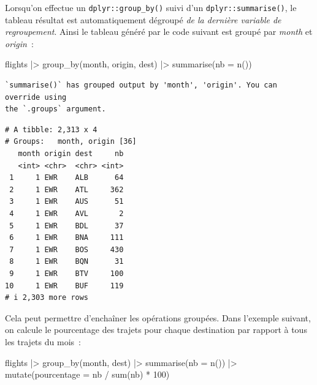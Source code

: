 \documentclass[
  letterpaper,
  DIV=11,
  numbers=noendperiod,
  oneside]{scrreprt}
\newenvironment{Shaded}{\begin{snugshade}}{\end{snugshade}}
\newcommand{\AttributeTok}[1]{\textcolor[rgb]{0.40,0.45,0.13}{#1}}
\newcommand{\DecValTok}[1]{\textcolor[rgb]{0.68,0.00,0.00}{#1}}
\newcommand{\FunctionTok}[1]{\textcolor[rgb]{0.28,0.35,0.67}{#1}}
\newcommand{\NormalTok}[1]{\textcolor[rgb]{0.00,0.23,0.31}{#1}}
\newcommand{\SpecialCharTok}[1]{\textcolor[rgb]{0.37,0.37,0.37}{#1}}
\begin{document}
Lorsqu'on effectue un \texttt{dplyr::group\_by()} suivi d'un
\texttt{dplyr::summarise()}, le tableau résultat est automatiquement
dégroupé \emph{de la dernière variable de regroupement}. Ainsi le
tableau généré par le code suivant est groupé par \emph{month} et
\emph{origin}~:

\begin{Shaded}
\begin{Highlighting}[]
\NormalTok{flights }\SpecialCharTok{|\textgreater{}}
  \FunctionTok{group\_by}\NormalTok{(month, origin, dest) }\SpecialCharTok{|\textgreater{}}
  \FunctionTok{summarise}\NormalTok{(}\AttributeTok{nb =} \FunctionTok{n}\NormalTok{())}
\end{Highlighting}
\end{Shaded}

\begin{verbatim}
`summarise()` has grouped output by 'month', 'origin'. You can override using
the `.groups` argument.
\end{verbatim}

\begin{verbatim}
# A tibble: 2,313 x 4
# Groups:   month, origin [36]
   month origin dest     nb
   <int> <chr>  <chr> <int>
 1     1 EWR    ALB      64
 2     1 EWR    ATL     362
 3     1 EWR    AUS      51
 4     1 EWR    AVL       2
 5     1 EWR    BDL      37
 6     1 EWR    BNA     111
 7     1 EWR    BOS     430
 8     1 EWR    BQN      31
 9     1 EWR    BTV     100
10     1 EWR    BUF     119
# i 2,303 more rows
\end{verbatim}

Cela peut permettre d'enchaîner les opérations groupées. Dans l'exemple
suivant, on calcule le pourcentage des trajets pour chaque destination
par rapport à tous les trajets du mois~:

\begin{Shaded}
\begin{Highlighting}[]
\NormalTok{flights }\SpecialCharTok{|\textgreater{}}
  \FunctionTok{group\_by}\NormalTok{(month, dest) }\SpecialCharTok{|\textgreater{}}
  \FunctionTok{summarise}\NormalTok{(}\AttributeTok{nb =} \FunctionTok{n}\NormalTok{()) }\SpecialCharTok{|\textgreater{}} 
  \FunctionTok{mutate}\NormalTok{(}\AttributeTok{pourcentage =}\NormalTok{ nb }\SpecialCharTok{/} \FunctionTok{sum}\NormalTok{(nb) }\SpecialCharTok{*} \DecValTok{100}\NormalTok{)}
\end{Highlighting}
\end{Shaded}
\end{document}
